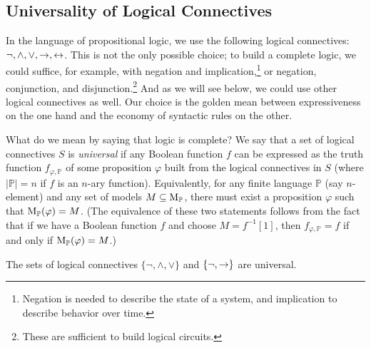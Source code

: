 \subsection{Universality of Logical Connectives}

In the language of propositional logic, we use the following logical connectives: $\neg, \land, \lor, \mathbin{\rightarrow}, \mathbin{\leftrightarrow}$. This is not the only possible choice; to build a complete logic, we could suffice, for example, with negation and implication,\footnote{Negation is needed to describe the state of a system, and implication to describe behavior over time.} or negation, conjunction, and disjunction.\footnote{These are sufficient to build logical circuits.} And as we will see below, we could use other logical connectives as well. Our choice is the golden mean between expressiveness on the one hand and the economy of syntactic rules on the other.

What do we mean by saying that logic is complete? 
We say that a set of logical connectives $S$ is \emph{universal} if any Boolean function $f$ can be expressed as the truth function $f_{\varphi,\mathbb{P}}$ of some proposition $\varphi$ built from the logical connectives in $S$ (where $|\mathbb{P}|=n$ if $f$ is an $n$-ary function). Equivalently, for any finite language $\mathbb{P}$ (say $n$-element) and any set of models $M \subseteq \operatorname{M}_\mathbb{P}$, there must exist a proposition $\varphi$ such that $\operatorname{M}_\mathbb{P}(\varphi) = M$. (The equivalence of these two statements follows from the fact that if we have a Boolean function $f$ and choose $M = f^{-1}[1]$, then $f_{\varphi,\mathbb{P}} = f$ if and only if $\operatorname{M}_\mathbb{P}(\varphi) = M$.)

\begin{proposition} \label{proposition:not-and-or-is-universal}
    The sets of logical connectives $\{\neg, \land, \lor\}$ and $\{\neg, \mathbin{\rightarrow}\}$ are universal.
\end{proposition}

